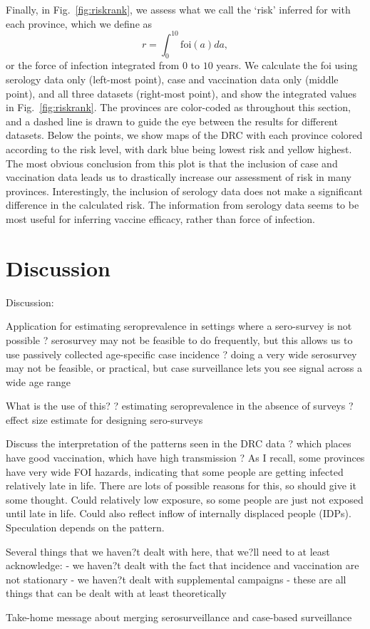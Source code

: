 \documentclass[nofootinbib,aps,pre,twocolumn,superscriptaddress,showkeys,showpacs]{revtex4-1}
\begin{document}
Finally, in Fig.~\ref{fig:riskrank}, we assess what we call the `risk' inferred for with each province, which we define as
\begin{equation}
r = \int_0^{10} \mathrm{foi}(a) da,
\end{equation}
 or the force of infection integrated from 0 to $10$ years. We calculate the foi using serology data only (left-most point), case and vaccination data only (middle point), and all three datasets (right-most point), and show the integrated values in Fig.~\ref{fig:riskrank}. The provinces are color-coded as throughout this section, and a dashed line is drawn to guide the eye between the results for different datasets. Below the points, we show maps of the DRC with each province colored according to the risk level, with dark blue being lowest risk and yellow highest. The most obvious conclusion from this plot is that the inclusion of case and vaccination data leads us to drastically increase our assessment of risk in many provinces. Interestingly, the inclusion of serology data does not make a significant difference in the calculated risk. The information from serology data seems to be most useful for inferring vaccine efficacy, rather than force of infection.

\section{Discussion \label{sec:Discussion}}
Discussion:

Application for estimating seroprevalence in settings where a sero-survey is not possible 
	? serosurvey may not be feasible to do frequently, but this allows us to use passively collected age-specific case incidence 
	? doing a very wide serosurvey may not be feasible, or practical, but case surveillance lets you see signal across a wide age range

What is the use of this?
	? estimating seroprevalence in the absence of surveys
	? effect size estimate for designing sero-surveys

Discuss the interpretation of the patterns seen in the DRC data 
	? which places have good vaccination, which have high transmission
	? As I recall, some provinces have very wide FOI hazards, indicating that some people are getting infected relatively late in life.  There are lots of possible reasons for this, so should give it some thought.  Could relatively low exposure, so some people are just not exposed until late in life.  Could also reflect inflow of internally displaced people (IDPs).  Speculation depends on the pattern. 

Several things that we haven?t dealt with here, that we?ll need to at least acknowledge:
	- we haven?t dealt with the fact that incidence and vaccination are not stationary
	- we haven?t dealt with supplemental campaigns
	- these are all things that can be dealt with at least theoretically

Take-home message about merging serosurveillance and case-based surveillance



\end{document}
